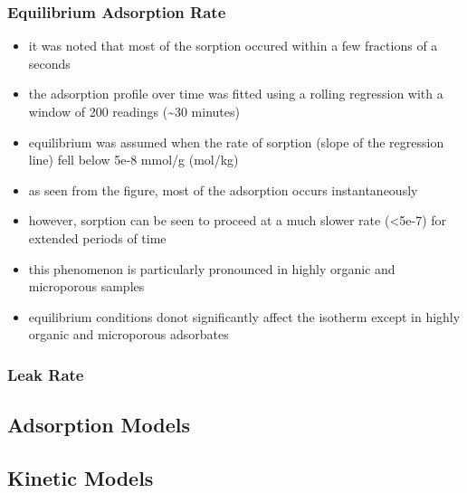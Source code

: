 \documentclass[11pt]{article}
\begin{document}
\subsubsection{Equilibrium Adsorption Rate}
\label{sec:org0dd8218}
\begin{itemize}
\item it was noted that most of the sorption occured within a few fractions of a seconds
\item the adsorption profile over time was fitted using a rolling regression with a window of 200 readings (\textasciitilde{}30 minutes)
\item equilibrium was assumed when the rate of sorption (slope of the regression line) fell below 5e-8 mmol/g (mol/kg)
\item as seen from the figure, most of the adsorption occurs instantaneously
\item however, sorption can be seen to proceed at a much slower rate (<5e-7) for extended periods of time
\item this phenomenon is particularly pronounced in highly organic and microporous samples
\item equilibrium conditions donot significantly affect the isotherm except in highly organic and microporous adsorbates
\end{itemize}
\subsubsection{Leak Rate}
\label{sec:org51c2211}
\subsection{Adsorption Models}
\label{sec:org3fdc50a}
\subsection{Kinetic Models}
\label{sec:org2006471}
\end{document}
